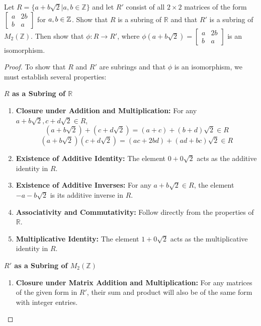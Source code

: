 \documentclass[12pt]{amsart}
\theoremstyle{definition}
\numberwithin{equation}{section}
\theoremstyle{plain}
\newcommand{\Z}{\mathbb{Z}}
\newcommand{\R}{\mathbb{R}}
\begin{document}
\begin{exercise}{17} Let $R = \{a +b\sqrt{2}| a,b \in \Z\}$ and let $R'$ consist of all $2\times 2$ matrices of the form 
    $\begin{bmatrix}
    a & 2b \\
    b & a
\end{bmatrix}$ 
for $a,\space b \in \Z$. Show that $R$ is a subring of $\R$ and that $R'$ is a subring of $M_2(\Z)$. Then show that $\phi : R \rightarrow R'$, where $\phi(a+b\sqrt{2}) = \begin{bmatrix}
    a & 2b \\
    b & a
\end{bmatrix}$ is an isomorphism.

\begin{proof}
    To show that \( R \) and \( R' \) are subrings and that \( \phi \) is an isomorphism, we must establish several properties:
    
    \textbf{\( R \) as a Subring of \( \R \)}
    
    \begin{enumerate}
        \item \textbf{Closure under Addition and Multiplication:} For any \( a + b\sqrt{2}, c + d\sqrt{2} \in R \),
           \[
           (a + b\sqrt{2}) + (c + d\sqrt{2}) = (a+c) + (b+d)\sqrt{2} \in R
           \]
           \[
           (a + b\sqrt{2})(c + d\sqrt{2}) = (ac + 2bd) + (ad+bc)\sqrt{2} \in R
           \]
        
        \item \textbf{Existence of Additive Identity:} The element \( 0 + 0\sqrt{2} \) acts as the additive identity in \( R \).
        
        \item \textbf{Existence of Additive Inverses:} For any \( a + b\sqrt{2} \in R \), the element \( -a - b\sqrt{2} \) is its additive inverse in \( R \).
        
        \item \textbf{Associativity and Commutativity:} Follow directly from the properties of \( \R \).
        
        \item \textbf{Multiplicative Identity:} The element \( 1 + 0\sqrt{2} \) acts as the multiplicative identity in \( R \).
    \end{enumerate}
    
    \textbf{\( R' \) as a Subring of \( M_2(\Z) \)}
    
    \begin{enumerate}
        \item \textbf{Closure under Matrix Addition and Multiplication:} For any matrices of the given form in \( R' \), their sum and product will also be of the same form with integer entries.
        

\end{enumerate}
\end{proof}
\end{exercise}
\end{document}
